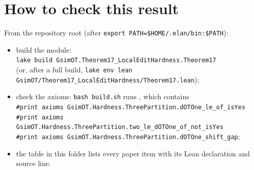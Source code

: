 \section{How to check this result}
From the repository root (after \texttt{export PATH=\$HOME/.elan/bin:\$PATH}):
\begin{itemize}
\item build the module:\\ \texttt{lake build GsimOT.Theorem17\_LocalEditHardness.Theorem17}\\
  (or, after a full build, \texttt{lake env lean GsimOT/Theorem17\_LocalEditHardness/Theorem17.lean});
\item check the axioms: \texttt{bash build.sh} runs , which contains\\
  \texttt{\#print axioms GsimOT.Hardness.ThreePartition.dOTOne\_le\_of\_isYes}\\
  \texttt{\#print axioms GsimOT.Hardness.ThreePartition.two\_le\_dOTOne\_of\_not\_isYes}\\
  \texttt{\#print axioms GsimOT.Hardness.ThreePartition.dOTOne\_shift\_gap};
\item the table  in this folder lists every paper item with its Lean
  declaration and source line.
\end{itemize}


